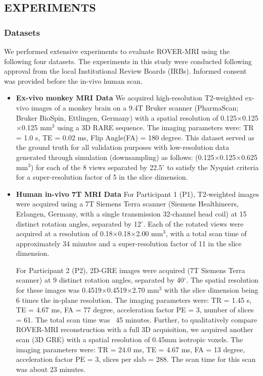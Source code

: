 \documentclass[AMA,STIX2COL]{MRM}
\begin{document}
\subsection{EXPERIMENTS}
\subsubsection{Datasets}
We performed extensive experiments to evaluate ROVER-MRI using the following four datasets. The experiments in this study were conducted following approval from the local Institutional Review Boards (IRBs). Informed consent was provided before the in-vivo human scan.
\begin{itemize}
\item \textbf{Ex-vivo monkey MRI Data} 
We acquired high-resolution T2-weighted ex-vivo images of a monkey brain on a 9.4T Bruker scanner (PharmaScan; Bruker BioSpin, Ettlingen, Germany) with a spatial resolution of 0.125$\times$0.125$\times$0.125 mm$^{3}$ using a 3D RARE sequence. The imaging parameters were: TR = 1.0 s, TE = 0.02 ms, Flip Angle(FA) = 180 degree. This dataset served as the ground truth for all validation purposes with low-resolution data generated through simulation (downsampling) as follows:
(0.125$\times$0.125$\times$0.625 mm$^{3}$) for each of the 8 views separated by 22.5$^\circ$ to satisfy the Nyquist criteria for a super-resolution factor of 5 in the slice dimension.  

\item \textbf{Human in-vivo 7T MRI Data}
For Participant 1 (P1), T2-weighted images were acquired using a 7T Siemens Terra scanner (Siemens Healthineers, Erlangen, Germany, with a single transmission 32-channel head coil) at 15 distinct rotation angles, separated by 12$^\circ$. Each of the rotated views were acquired at a resolution of 0.18$\times$0.18$\times$2.00 mm$^{3}$, with a total scan time of approximately 34 minutes and a super-resolution factor of 11 in the slice dimension.

For Participant 2 (P2), 2D-GRE images were acquired (7T Siemens Terra scanner) at 9 distinct rotation angles, separated by 40$^\circ$. The spatial resolution for these images was 0.4519$\times$0.4519$\times$2.70 mm$^{3}$ with the slice dimension being 6 times the in-plane resolution. The imaging parameters were: TR = 1.45 s, TE = 4.67 ms, FA = 77 degree, acceleration factor PE = 3, number of slices = 61. The total scan time was ~45 minutes. Further, to qualitatively compare ROVER-MRI reconstruction with a full 3D acquisition, we acquired another scan (3D GRE) with a spatial resolution of 0.45mm isotropic voxels. The imaging parameters were: TR = 24.0 ms, TE = 4.67 ms, FA = 13 degree, acceleration factor PE = 3, slices per slab = 288. The scan time for this scan was about 23 minutes.


\end{itemize}
\end{document}
